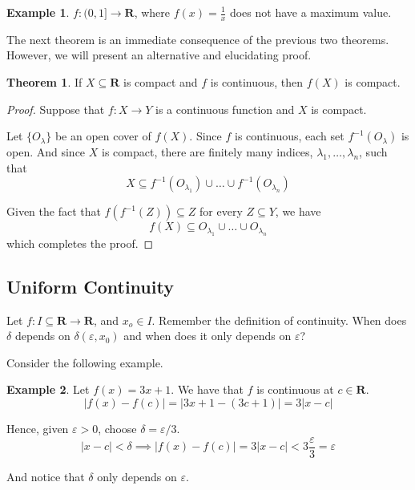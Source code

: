 \documentclass[tikz,12pt,a4paper]{article}
\theoremstyle{definition}
\newtheorem{theorem}{Theorem}[section]
\newtheorem{example}{Example}[section]
\begin{document}
\begin{example}
	$f:(0,1] \longrightarrow \textbf{R}$, where $f(x) = \frac{1}{x}$ does not have a maximum value.
\end{example}

The next theorem is an immediate consequence of the previous two theorems. However, we will present an alternative and elucidating proof.

\newpage

\begin{theorem}
	If $X \subseteq \textbf{R}$ is compact and $f$ is continuous, then $f(X)$ is compact.
\end{theorem}

\begin{proof}
	Suppose that $f : X \longrightarrow Y$ is a continuous function and $X$ is compact. 
	
	Let $\{ O_\lambda \}$ be an open cover of $f(X)$. Since $f$ is continuous, each set $f^{-1}(O_\lambda)$ is open. And since $X$ is compact, there are finitely many indices, $\lambda_1, \ldots, \lambda_n$, such that
	\[
		X \subseteq f^{-1}(O_{\lambda_1}) \cup \ldots \cup f^{-1}(O_{\lambda_n})
	\]
	
	Given the fact that $f(f^{-1}(Z))\subseteq Z$ for every $Z \subseteq Y$, we have
	\[
		f(X) \subseteq O_{\lambda_1} \cup \ldots \cup O_{\lambda_n}
	\]
	which completes the proof.
\end{proof}

\subsection{Uniform Continuity}

Let $f : I \subseteq \textbf{R} \longrightarrow \textbf{R}$, and $x_o \in I$. Remember the definition of continuity. When does $\delta$ depends on $\delta (\varepsilon, x_0)$ and when does it only depends on $\varepsilon$? 

Consider the following example.

\begin{example}
	Let $f(x) = 3x+1$. We have that $f$ is continuous at $c \in \textbf{R}$.
	\[
		| f(x) - f(c) | = | 3x+1 - (3c+1) | = 3 |x-c|
	\]
	
	Hence, given $\varepsilon > 0$, choose $\delta = \varepsilon/3$.
	\[
		| x - c | < \delta \implies | f(x) - f(c) | = 3 |x-c| < 3 \frac{\varepsilon}{3} = \varepsilon
	\]
	
	And notice that $\delta$ only depends on $\varepsilon$.
\end{example}
\end{document}

